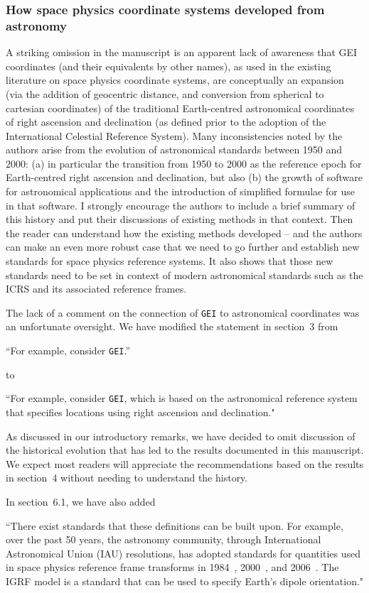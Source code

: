 \documentclass[11pt]{article}
\begin{document}
\subsubsection{How space physics coordinate systems developed from astronomy}
A striking omission in the manuscript is an apparent lack of awareness that GEI coordinates (and their
equivalents by other names), as used in the existing literature on space physics coordinate systems, are
conceptually an expansion (via the addition of geocentric distance, and conversion from spherical to
cartesian coordinates) of the traditional Earth-centred astronomical coordinates of right ascension and
declination (as defined prior to the adoption of the International Celestial Reference System). Many
inconsistencies noted by the authors arise from the evolution of astronomical standards between 1950 and
2000: (a) in particular the transition from 1950 to 2000 as the reference epoch for Earth-centred right
ascension and declination, but also (b) the growth of software for astronomical applications and the
introduction of simplified formulae for use in that software. I strongly encourage the authors to include a
brief summary of this history and put their discussions of existing methods in that context. Then the reader
can understand how the existing methods developed – and the authors can make an even more robust case
that we need to go further and establish new standards for space physics reference systems. It also shows
that those new standards need to be set in context of modern astronomical standards such as the ICRS and
its associated reference frames.
\\
{\color{violet}
\begin{leftbar}
The lack of a comment on the connection of \texttt{GEI} to astronomical coordinates was an unfortunate oversight. We have modified the statement in section~3 from

``For example, consider \texttt{GEI}.''

to

``For example, consider \texttt{GEI}, which is based on the astronomical reference system that specifies locations using right ascension and declination." 

As discussed in our introductory remarks, we have decided to omit discussion of the historical evolution that has led to the results documented in this manuscript. We expect most readers will appreciate the recommendations based on the results in section~4 without needing to understand the history. 

In section~6.1, we have also added

``There exist standards that these definitions can be built upon. For example, over the past 50 years, the astronomy community, through International Astronomical Union (IAU) resolutions, has adopted standards for quantities used in space physics reference frame transforms in 1984~\cite{Aoki1982}, 2000~\cite{Capitaine2003}, and 2006~\cite{Capitaine2005}. The IGRF model is a standard that can be used to specify Earth's dipole orientation."

\end{leftbar}
}
\end{document}
